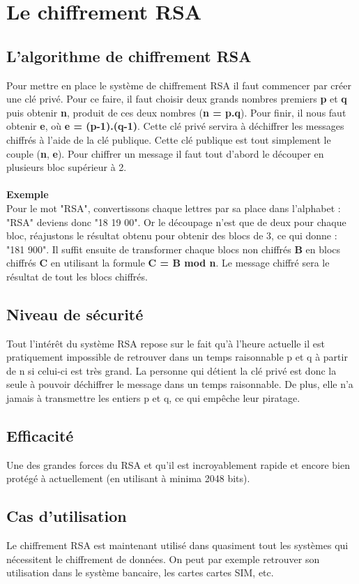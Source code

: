 \chapter{Le chiffrement RSA}
	\section{L'algorithme de chiffrement RSA}
		Pour mettre en place le système de chiffrement RSA il faut commencer par créer une clé privé. Pour ce faire, il faut choisir deux grands nombres premiers \textbf{p} et \textbf{q} puis obtenir \textbf{n}, produit de ces deux nombres (\textbf{n = p.q}). Pour finir, il nous faut obtenir \textbf{e}, où \textbf{e = (p-1).(q-1)}. Cette clé privé servira à déchiffrer les messages chiffrés à l'aide de la clé publique. Cette clé publique est tout simplement le couple (\textbf{n}, \textbf{e}).
		Pour chiffrer un message il faut tout d'abord le découper en plusieurs bloc supérieur à 2.
		\\\\\textbf{Exemple}\\
		Pour le mot "RSA", convertissons chaque lettres par sa place dans l’alphabet : "RSA" deviens donc "18 19 00". Or le découpage n'est que de deux pour chaque bloc, réajustons le résultat obtenu pour obtenir des blocs de 3, ce qui donne : "181 900". Il suffit ensuite de transformer chaque blocs non chiffrés \textbf{B} en blocs chiffrés \textbf{C} en utilisant la formule \textbf{C = B mod n}. Le message chiffré sera le résultat de tout les blocs chiffrés. 
	\section{Niveau de sécurité}
		Tout l'intérêt du système RSA repose sur le fait qu'à l'heure actuelle il est pratiquement impossible de retrouver dans un temps raisonnable p et q à partir de n si celui-ci est très grand. La personne qui détient la clé privé est donc la seule à pouvoir déchiffrer le message dans un temps raisonnable. De plus, elle n'a jamais à transmettre les entiers p et q, ce qui empêche leur piratage.
		
	\section{Efficacité}
		Une des grandes forces du RSA et qu'il est incroyablement rapide et encore bien protégé à actuellement (en utilisant à minima 2048 bits).
		
	\section{Cas d'utilisation}
		Le chiffrement RSA est maintenant utilisé dans quasiment tout les systèmes qui nécessitent le chiffrement de données. On peut par exemple retrouver son utilisation dans le système bancaire, les cartes cartes SIM, etc.